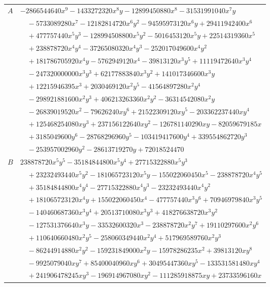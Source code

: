 \documentclass[11pt]{article}
\begin{document}
\begin{longtable}{@{}ll@{}}
$A$ & $-2866544640x^{9}-1433272320x^{8}y-12899450880x^{8}-31531991040x^{7}y$\\
 & $\quad -5733089280x^{7}-12182814720x^{6}y^{2}-94595973120x^{6}y+29411942400x^{6}$\\
 & $\quad +477757440x^{5}y^{3}-128994508800x^{5}y^{2}-5016453120x^{5}y+22514319360x^{5}$\\
 & $\quad +238878720x^{4}y^{4}-37265080320x^{4}y^{3}-252017049600x^{4}y^{2}$\\
 & $\quad +181786705920x^{4}y-5762949120x^{4}-39813120x^{3}y^{5}+11119472640x^{3}y^{4}$\\
 & $\quad -247320000000x^{3}y^{3}+62177883840x^{3}y^{2}+141017346600x^{3}y$\\
 & $\quad +12215946395x^{3}+2030469120x^{2}y^{5}-41564897280x^{2}y^{4}$\\
 & $\quad -298921881600x^{2}y^{3}+406213263360x^{2}y^{2}-36314542080x^{2}y$\\
 & $\quad -26839019520x^{2}-79626240xy^{6}+21522309120xy^{5}-203362237440xy^{4}$\\
 & $\quad +125468254080xy^{3}+237156122640xy^{2}-126781140290xy-82059679185x$\\
 & $\quad +3185049600y^{6}-28768296960y^{5}-103419417600y^{4}+339554862720y^{3}$\\
 & $\quad -253957002960y^{2}-28613719270y+72018524470$\\
$B$ & $238878720x^{5}y^{5}-35184844800x^{5}y^{4}+27715322880x^{5}y^{3}$\\
 & $\quad +23232493440x^{5}y^{2}-181065723120x^{5}y-155022060450x^{5}-238878720x^{4}y^{5}$\\
 & $\quad +35184844800x^{4}y^{4}-27715322880x^{4}y^{3}-23232493440x^{4}y^{2}$\\
 & $\quad +181065723120x^{4}y+155022060450x^{4}-477757440x^{3}y^{6}+70946979840x^{3}y^{5}$\\
 & $\quad -140460687360x^{3}y^{4}+20513710080x^{3}y^{3}+418276638720x^{3}y^{2}$\\
 & $\quad -127531376640x^{3}y-33532600320x^{3}-238878720x^{2}y^{7}+19110297600x^{2}y^{6}$\\
 & $\quad +110640660480x^{2}y^{5}-258060349440x^{2}y^{4}+517969589760x^{2}y^{3}$\\
 & $\quad -86244914880x^{2}y^{2}-159231849000x^{2}y-15978286235x^{2}+39813120xy^{8}$\\
 & $\quad -9925079040xy^{7}+85400040960xy^{6}+30495447360xy^{5}-133531581480xy^{4}$\\
 & $\quad +241906478245xy^{3}-196914967080xy^{2}-111285918875xy+23733596160x$\\

\end{longtable}
\end{document}
